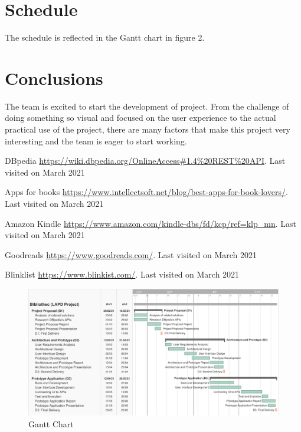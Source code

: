 \documentclass[twocolumn,twoside,11pt,a4paper]{article}
\begin{document}

\section{Schedule}\label{sec:schedule}

The schedule is reflected in the Gantt chart in figure 2.




\section{Conclusions}\label{sec:conclusions}

The team is excited to start the development of project. From the challenge of doing something so visual and focused on the user experience to the actual practical use of the project, there are many factors that make this project very interesting and the team is eager to start working.


\begin{thebibliography}{9}
DBpedia 
\url{https://wiki.dbpedia.org/OnlineAccess#1.4\%20REST\%20API}. 
Last visited on March 2021


Apps for books
\url{https://www.intellectsoft.net/blog/best-apps-for-book-lovers/}. 
Last visited on March 2021


Amazon Kindle
\url{https://www.amazon.com/kindle-dbs/fd/kcp/ref=klp_mn}. 
Last visited on March 2021


Goodreads 
\url{https://www.goodreads.com/}. 
Last visited on March 2021


Blinklist
\url{https://www.blinkist.com/}. 
Last visited on March 2021

\end{thebibliography}

\renewcommand{\bibname}{Referências}
%
%

%



\begin{figure}
  \begin{center}
  \includegraphics[width=\textwidth,height=\textheight,keepaspectratio,angle=90]{report/ganttpng.png}
  \caption{Gantt Chart}
  \end{center}
\end{figure}
\end{document}
